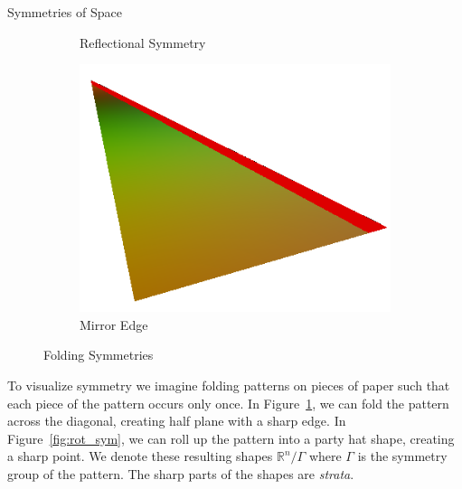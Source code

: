 \documentclass[final]{beamer}
\newlength{\onecolwid}
\begin{document}
\begin{frame}[t]
\begin{columns}[t]
\begin{column}{\onecolwid}
\begin{block}{Symmetries of Space}
\begin{figure}[c]
\begin{subfigure}[c]{0.25\textwidth}
        \caption{Reflectional Symmetry}
        \label{fig:ref_sym}
        \end{subfigure}
        \begin{subfigure}[c]{0.2\textwidth}
            \includegraphics[width=\textwidth]{images/mirror_edge.png}
            \caption{Mirror Edge}
        \end{subfigure}
        \caption{Folding Symmetries}
        \label{fig:sym}
    \end{figure}

    To visualize symmetry we imagine folding patterns on pieces of paper
such that each piece of the pattern occurs only once. In
Figure~\ref{fig:ref_sym}, we can fold the pattern across the diagonal,
creating half plane with a sharp edge. In Figure~\ref{fig:rot_sym}, we can
roll up the pattern into a party hat shape, creating a sharp point. We
denote these resulting shapes $\mathbb{R}^n/\Gamma$ where $\Gamma$ is the
symmetry group of the pattern. The sharp parts of the shapes are \emph{strata}. 

\end{block}



\end{column}
\end{columns}
\end{frame}
\end{document}
